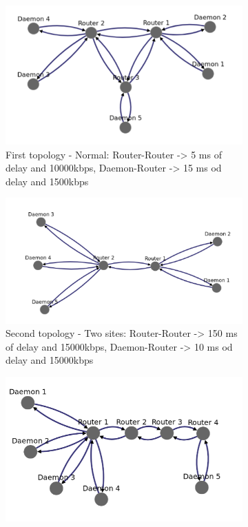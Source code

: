 \documentclass{eplmastersthesis}
\begin{document}
          \begin{figure}[H]
            \begin{subfigure}{.33\textwidth}
              \centering
              \includegraphics[width=1.0\linewidth]{figures/user_case/Raft_topo_1.png}
              \caption{First topology - Normal: Router-Router -> 5 ms of delay and 10000kbps, Daemon-Router -> 15 ms od delay and 1500kbps}
              \label{fig:topo1}
            \end{subfigure}
            \begin{subfigure}{.33\textwidth}
              \centering
              \includegraphics[width=1.0\linewidth]{figures/user_case/Raft_topo_2.png}
              \caption{Second topology - Two sites: Router-Router -> 150 ms of delay and 15000kbps, Daemon-Router -> 10 ms od delay and 15000kbps}
              \label{fig:topo2}
            \end{subfigure}
            \begin{subfigure}{.33\textwidth}
              \centering
              \includegraphics[width=1.0\linewidth]{figures/user_case/Raft_topo_3.png}

\end{subfigure}
\end{figure}
\end{document}
